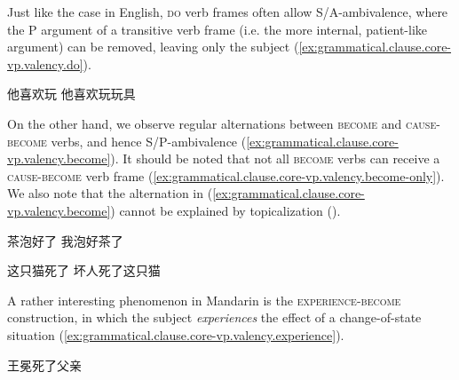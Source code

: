 \documentclass[UTF8, a4paper, oneside, scheme=plain, 12pt]{ctexrep}
\newcommand*{\category}[1]{\textsc{#1}}
\begin{document}
Just like the case in English, \category{do} verb frames often allow S/A-ambivalence,
where the P argument of a transitive verb frame (i.e. the more internal, patient-like argument) can be removed, leaving only the subject (\ref{ex:grammatical.clause.core-vp.valency.do}).

\begin{exe}
    \ex\label{ex:grammatical.clause.core-vp.valency.do} \begin{xlist}
        \ex 他喜欢玩
        \ex 他喜欢玩玩具
    \end{xlist}
\end{exe}

On the other hand, we observe regular alternations between \category{become} and \category{cause}-\category{become} verbs,
and hence S/P-ambivalence (\ref{ex:grammatical.clause.core-vp.valency.become}).
It should be noted that not all \category{become} verbs can receive a \category{cause}-\category{become} verb frame (\ref{ex:grammatical.clause.core-vp.valency.become-only}).
We also note that the alternation in (\ref{ex:grammatical.clause.core-vp.valency.become})
cannot be explained by topicalization ().

\begin{exe}
    \ex\label{ex:grammatical.clause.core-vp.valency.become} \begin{xlist}
        \ex\label{ex:grammatical.clause.core-vp.valency.become.1} 茶泡好了
        \ex 我泡好茶了
    \end{xlist}

    \ex\label{ex:grammatical.clause.core-vp.valency.become-only}
    \begin{xlist}
        \ex\label{ex:grammatical.clause.core-vp.valency.become-only.1} 这只猫死了
        \ex *坏人死了这只猫
    \end{xlist}
\end{exe}

A rather interesting phenomenon in Mandarin is the \category{experience}-\category{become} construction,
in which the subject \emph{experiences} the effect of a change-of-state situation
(\ref{ex:grammatical.clause.core-vp.valency.experience}).

\begin{exe}
    \ex\label{ex:grammatical.clause.core-vp.valency.experience}
    \begin{xlist}
        \ex 王冕死了父亲
    \end{xlist}
\end{exe}
\end{document}
